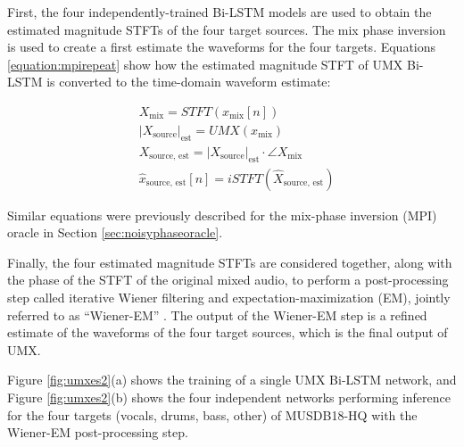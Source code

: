\documentclass[report.tex]{subfiles}
\begin{document}
First, the four independently-trained Bi-LSTM models are used to obtain the estimated magnitude STFTs of the four target sources. The mix phase inversion is used to create a first estimate the waveforms for the four targets. Equations \eqref{equation:mpirepeat} show how the estimated magnitude STFT of UMX Bi-LSTM is converted to the time-domain waveform estimate:

\begin{align}\tag{30}\label{equation:mpirepeat}
	\nonumber & X_{\text{mix}} = \mathit{STFT}(x_{\text{mix}}[n])\\
	\nonumber & {|X_{\text{source}}|}_{\text{est}} = \mathit{UMX}(x_{\text{mix}})\\
	\nonumber & X_{\text{source, est}} = {|X_{\text{source}}|}_{\text{est}} \cdot \angle{X_{\text{mix}}}\\
	\nonumber & \hat{x}_{\text{source, est}}[n] = \mathit{iSTFT}(\hat{X}_{\text{source, est}})
\end{align}

Similar equations were previously described for the mix-phase inversion (MPI) oracle in Section \ref{sec:noisyphaseoracle}.

Finally, the four estimated magnitude STFTs are considered together, along with the phase of the STFT of the original mixed audio, to perform a post-processing step called iterative Wiener filtering and expectation-maximization (EM), jointly referred to as ``Wiener-EM'' \parencite{umxorig1, wiener2, wiener3, wiener4}. The output of the Wiener-EM step is a refined estimate of the waveforms of the four target sources, which is the final output of UMX.

Figure \ref{fig:umxes2}(a) shows the training of a single UMX Bi-LSTM network, and Figure \ref{fig:umxes2}(b) shows the four independent networks performing inference for the four targets (vocals, drums, bass, other) of MUSDB18-HQ with the Wiener-EM post-processing step.
\end{document}
